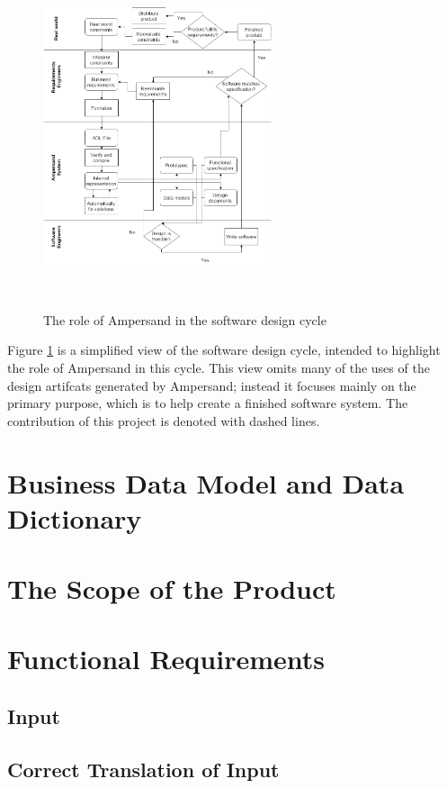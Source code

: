 \documentclass[12pt]{report}
\begin{document}
\begin{figure}[!htb]
\begin{center}
\includegraphics[width=0.6\textwidth]{../figures/business_process}
\caption{The role of Ampersand in the software design cycle}~\label{fig:BusinessProcess}
\end{center}
\end{figure}

Figure \ref{fig:BusinessProcess} is a simplified view of the software design
cycle, intended to highlight the role of Ampersand in this cycle. This view
omits many of the uses of the design artifcats generated by Ampersand; instead
it focuses mainly on the primary purpose, which is to help create a finished
software system. The contribution of this project is denoted with dashed lines.

\section{Business Data Model and Data Dictionary}\label{sec:DataModel}

\section{The Scope of the Product}\label{sec:ScopeOfProduct}
\section{Functional Requirements}\label{sec:Functional}
\subsection{Input}
\subsection{Correct Translation of Input}
\end{document}
